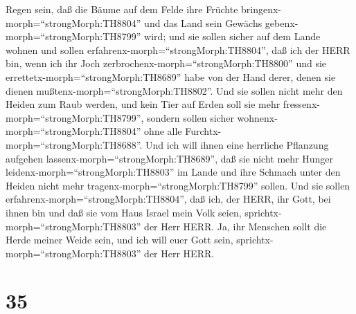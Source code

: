 Regen sein,  daß die Bäume auf dem Felde ihre Früchte
bringenx-morph=``strongMorph:TH8804'' und das Land sein Gewächs
gebenx-morph=``strongMorph:TH8799'' wird; und sie sollen sicher auf dem
Lande wohnen und sollen erfahrenx-morph=``strongMorph:TH8804'', daß ich
der HERR bin, wenn ich ihr Joch zerbrochenx-morph=``strongMorph:TH8800''
und sie errettetx-morph=``strongMorph:TH8689'' habe von der Hand derer,
denen sie dienen mußtenx-morph=``strongMorph:TH8802''.  Und
sie sollen nicht mehr den Heiden zum Raub werden, und kein Tier auf
Erden soll sie mehr fressenx-morph=``strongMorph:TH8799'', sondern
sollen sicher wohnenx-morph=``strongMorph:TH8804'' ohne alle
Furchtx-morph=``strongMorph:TH8688''.  Und ich will ihnen
eine herrliche Pflanzung aufgehen lassenx-morph=``strongMorph:TH8689'',
daß sie nicht mehr Hunger leidenx-morph=``strongMorph:TH8803'' im Lande
und ihre Schmach unter den Heiden nicht mehr
tragenx-morph=``strongMorph:TH8799'' sollen.  Und sie
sollen erfahrenx-morph=``strongMorph:TH8804'', daß ich, der HERR, ihr
Gott, bei ihnen bin und daß sie vom Haus Israel mein Volk seien,
sprichtx-morph=``strongMorph:TH8803'' der Herr HERR.  Ja,
ihr Menschen sollt die Herde meiner Weide sein, und ich will euer Gott
sein, sprichtx-morph=``strongMorph:TH8803'' der Herr HERR.

\hypertarget{section-34}{%
\section{35}\label{section-34}}

